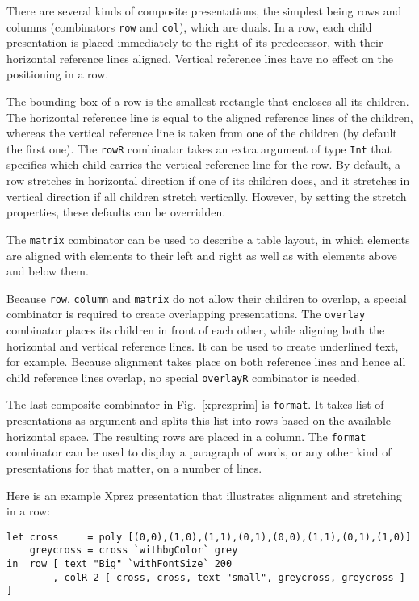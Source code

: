 \par There are several kinds of composite presentations, the simplest being
        rows and columns (combinators \texttt{row} and \texttt{col}), which are duals.
        In a row, each child presentation is placed immediately to the right of its
        predecessor, with their horizontal reference lines aligned. Vertical reference
        lines have no effect on the positioning in a row. \begin{center}
\end{center}
\par \noindent The bounding box of a row is the smallest rectangle
        that encloses all its children. The horizontal reference line is equal to the
        aligned reference lines of the children, whereas the vertical reference line is
        taken from one of the children (by default the first one). The \texttt{rowR}
        combinator takes an extra argument of type \texttt{Int} that specifies which
        child carries the vertical reference line for the row. \texttt{}By default, a
        row stretches in horizontal direction if one of its children does, and it
        stretches in vertical direction if all children stretch vertically. However, by
        setting the stretch properties, these defaults can be overridden. 
\par  The \texttt{matrix} combinator can be used to describe a table
        layout, in which elements are aligned with elements to their left and right as
        well as with elements above and below them. 
\par Because \texttt{row}, \texttt{column} and \texttt{matrix} do not allow
        their children to overlap, a special combinator is required to create
        overlapping presentations. The \texttt{overlay} combinator places its children
        in front of each other, while aligning both the horizontal and vertical
        reference lines. It can be used to create underlined text, for example. Because
        alignment takes place on both reference lines and hence all child reference
        lines overlap, no special \texttt{overlayR} combinator is needed. 
\par The last composite combinator in Fig.~\ref{xprezprim}
        is \texttt{format}. It takes list of presentations as argument and splits this
        list into rows based on the available horizontal space. The resulting rows are
        placed in a column. The \texttt{format} combinator can be used to display a
        paragraph of words, or any other kind of presentations for that matter, on a
        number of lines. 
\par Here is an example {\sc Xprez} presentation that illustrates
        alignment and stretching in a row:\begin{small}\begin{verbatim}let cross     = poly [(0,0),(1,0),(1,1),(0,1),(0,0),(1,1),(0,1),(1,0)]
    greycross = cross `withbgColor` grey
in  row [ text "Big" `withFontSize` 200
        , colR 2 [ cross, cross, text "small", greycross, greycross ] ] \end{verbatim}\end{small}

